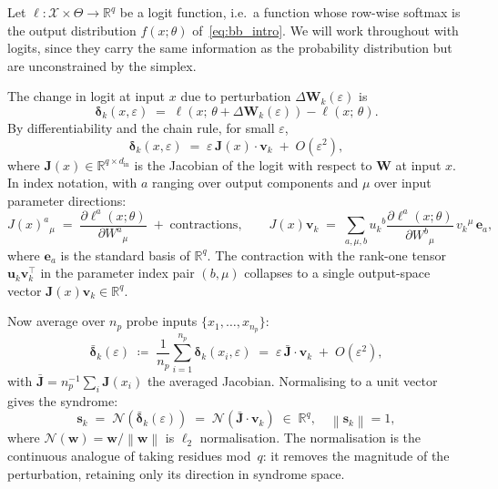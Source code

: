 \documentclass[11pt,a4paper]{article}
\theoremstyle{definition}
\newcommand{\Wm}{\mathbf{W}}
\newcommand{\Jm}{\mathbf{J}}
\newcommand{\vk}[1][]{\mathbf{v}_{#1}}
\newcommand{\uk}[1][]{\mathbf{u}_{#1}}
\newcommand{\sk}[1][]{\mathbf{s}_{#1}}
\newcommand{\Rbb}{\mathbb{R}}
\newcommand{\Nop}{\mathcal{N}}
\newcommand{\norm}[1]{\left\lVert#1\right\rVert}
\newcommand{\dimin}{d_{\mathrm{in}}}
\begin{document}
Let $\ell: \mathcal{X}\times\Theta \to \Rbb^q$ be a logit function, i.e.\ a function whose row-wise softmax is the output distribution $f(x;\theta)$ of~\eqref{eq:bb_intro}. We will work throughout with logits, since they carry the same information as the probability distribution but are unconstrained by the simplex.

The change in logit at input $x$ due to perturbation $\Delta\Wm_k(\varepsilon)$ is
\begin{equation}
  \boldsymbol{\delta}_k(x,\varepsilon)
  \;=\; \ell(x;\, \theta + \Delta\Wm_k(\varepsilon))
       - \ell(x;\, \theta).
  \label{eq:delta_def}
\end{equation}
By differentiability and the chain rule, for small $\varepsilon$,
\begin{equation}
  \boldsymbol{\delta}_k(x,\varepsilon)
  \;=\; \varepsilon\, \Jm(x)\cdot \vk[k] \;+\; O(\varepsilon^2),
  \label{eq:taylor1}
\end{equation}
where $\Jm(x) \in \Rbb^{q\times\dimin}$ is the Jacobian of the logit with respect to $\Wm$ at input $x$. In index notation, with $a$ ranging over output components and $\mu$ over input parameter directions:
\begin{equation}
  J(x)^a{}_\mu \;=\; \frac{\partial \ell^a(x;\theta)}
                          {\partial W^a{}_\mu} \;+\; \text{contractions}
  ,\qquad
  J(x)\vk[k] \;=\;
  \sum_{a,\mu,b}
   u_k{}^b \frac{\partial \ell^a(x;\theta)}{\partial W^b{}_\mu}\, v_k{}^\mu\,\boldsymbol{e}_a ,
  \label{eq:jacobian_def}
\end{equation}
where $\boldsymbol{e}_a$ is the standard basis of $\Rbb^q$. The contraction with the rank-one tensor $\uk[k]\vk[k]^\top$ in the parameter index pair $(b,\mu)$ collapses to a single output-space vector $\Jm(x)\vk[k]\in\Rbb^q$.

Now average over $n_p$ probe inputs $\{x_1,\dots,x_{n_p}\}$:
\begin{equation}
  \bar{\boldsymbol{\delta}}_k(\varepsilon)
  \;\coloneqq\; \frac{1}{n_p}\sum_{i=1}^{n_p}
                \boldsymbol{\delta}_k(x_i,\varepsilon)
  \;=\; \varepsilon\, \bar{\Jm}\cdot\vk[k] \;+\; O(\varepsilon^2),
  \label{eq:avg_delta}
\end{equation}
with $\bar{\Jm} = n_p^{-1}\sum_i \Jm(x_i)$ the averaged Jacobian. Normalising to a unit vector gives the syndrome:
\begin{equation}
  \sk[k] \;=\; \Nop\!\left(\bar{\boldsymbol{\delta}}_k(\varepsilon)\right)
        \;=\; \Nop(\bar{\Jm}\cdot\vk[k]) \;\in\; \Rbb^q,
        \quad \norm{\sk[k]} = 1,
  \label{eq:sk_def}
\end{equation}
where $\Nop(\boldsymbol{w}) = \boldsymbol{w}/\norm{\boldsymbol{w}}$ is $\ell_2$ normalisation. The normalisation is the continuous analogue of taking residues mod~$q$: it removes the magnitude of the perturbation, retaining only its direction in syndrome space.
\end{document}
